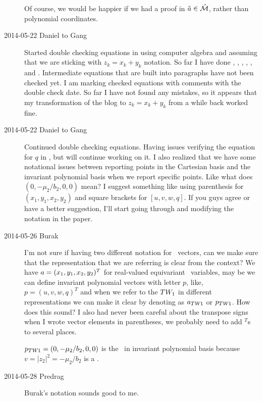 \begin{description}
Of course, we would be happier if we had a proof in $\hat{a} \in \hat{\cal M}$,
rather than polynomial coordinates.



\item[2014-05-22 Daniel to Gang] Started double checking equations in  using computer algebra and assuming that we are sticking with $z_k = x_k + y_k$ notation. So far I have done , ,
, , , and . Intermediate equations that are built into paragraphs have not been checked yet. I am marking checked equations with comments with the double check date.
So far I have not found any mistakes, so it appears that my transformation of the blog to $z_k = x_k + y_k$ from a while back worked fine.

\item[2014-05-22 Daniel to Gang] Continued double checking equations. Having issues verifying the equation for $q$ in , but will continue working on it. I also realized that we have some notational issues between reporting points in the Cartesian basis and the invariant polynomial basis when we report specific points. Like what does $(0,-\mu_2/b_2,0,0)$ mean? I suggest something like using parenthesis for $(x_1,y_1,x_2,y_2)$ and square brackets for $[u,v,w,q]$. If you guys agree or have a better suggestion, I'll start going through and modifying the notation in the paper.

\item[2014-05-26 Burak] I'm not sure if having two different notation for
\statesp\ vectors, can we make sure that the representation that we are
referring is clear from the context? We have $a = (x_1, y_1, x_2, y_2)^T$
for real-valued equivariant \statesp\ variables, may be we can define
invariant polynomial vectors with letter $p$, like, $p = (u, v, w, q)^T$ and
when we refer to the $TW_{1}$ in different representations we can make
it clear by denoting as $a_{TW_{}1}$ or $p_{TW_{}1}$. How does
this sound? I also had never been careful about the transpose signs when
I wrote vector elements in parentheses, we probably need to add $\phantom{}^T$s
to several places.

$p_{TW_{}1} =(0,-\mu_2/b_2,0,0)$ is the \reqv\ in invariant polynomial basis
because $v = |z_2|^2 = - \mu_2 / b_2$ is a \reqv.

\item[2014-05-28 Predrag] Burak's notation sounds good to me.


\end{description}
